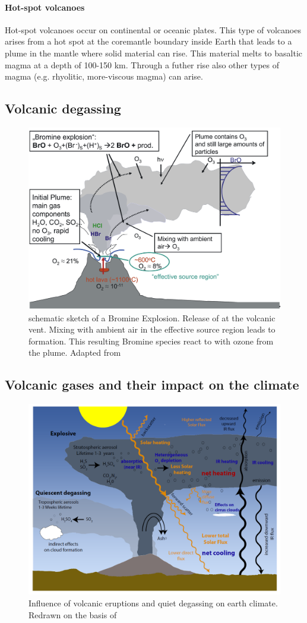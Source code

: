 \documentclass  [
  paper    = a4,
  BCOR     = 10mm,
  twoside,
  fontsize = 12pt,
  fleqn,
  toc      = bibnumbered,
  toc      = listofnumbered,
  numbers  = noendperiod,
  headings = normal,
  listof   = leveldown,
  version  = 3.03
]                                       {scrreprt}
\begin{document}
\paragraph{ Hot-spot volcanoes} Hot-spot volcanoes occur on continental or oceanic plates. This type of volcanoes arises from a hot spot at the coremantle boundary inside Earth that leads to a plume in the mantle where solid material can rise. This material melts to basaltic magma at a depth of 100-150 km. Through a futher rise also other types of magma (e.g. rhyolitic, more-viscous magma) can arise.

	\subsection{Volcanic degassing}


		\begin{figure}
		\centering
		\includegraphics[width=0.7\linewidth]{Bilder/Simon/Bilder_Tung/BrO_Plume}
		\caption{schematic sketch of a Bromine Explosion.
			Release of  at the volcanic vent. Mixing with ambient air in the effective source region leads to  formation. This resulting Bromine species react to  with ozone from the plume. Adapted from \cite{bobrowski2007reactive}}
		\label{fig:broplume}
	\end{figure}
	\subsection{Volcanic gases and their impact on the climate}


	\begin{figure}
		\centering
		\includegraphics[width=0.7\linewidth]{Bilder/Simon/Bilder_Tung/Climate_Influence}
		\caption{Influence of volcanic eruptions and quiet degassing on earth climate. Redrawn on the basis of \cite{robock2000volcanic}}
		\label{fig:climateinfluence}
	\end{figure}
\end{document}
